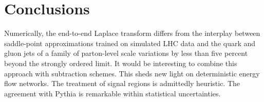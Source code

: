 \section{Conclusions}\label{sec:conclusions}

Numerically, the end-to-end Laplace transform differs from the interplay
between saddle-point approximations trained on simulated LHC data and
the quark and gluon jets of a family of parton-level scale variations by
less than five percent beyond the strongly ordered limit. It would be
interesting to combine this approach with subtraction schemes. This
sheds new light on deterministic energy flow networks. The treatment of
signal regions is admittedly heuristic. The agreement with Pythia is
remarkable within statistical uncertainties.

